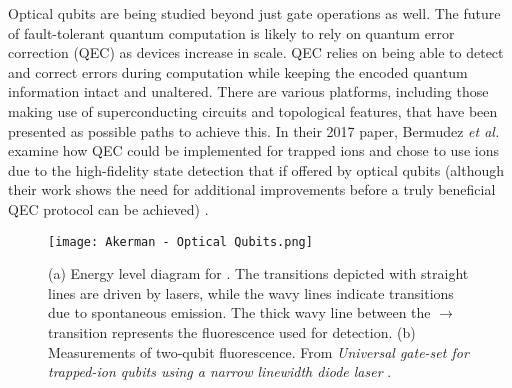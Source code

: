 Optical qubits are being studied beyond just gate operations as well. The future of fault-tolerant quantum computation is likely to rely on quantum error correction (QEC) as devices increase in scale. QEC relies on being able to detect and correct errors during computation while keeping the encoded quantum information intact and unaltered. There are various platforms, including those making use of superconducting circuits and topological features, that have been presented as possible paths to achieve this. In their 2017 paper, Bermudez \textit{et al.} examine how QEC could be implemented for trapped ions and chose to use  ions due to the high-fidelity state detection that if offered by optical qubits (although their work shows the need for additional improvements before a truly beneficial QEC protocol can be achieved) \cite{Bermudez}.

\begin{figure}[h]
    \texttt{[image: Akerman - Optical Qubits.png]}
    \caption{(a) Energy level diagram for . The transitions depicted with straight lines are driven by lasers, while the wavy lines indicate transitions due to spontaneous emission. The thick wavy line between the  $\rightarrow$  transition represents the fluorescence used for detection. (b) Measurements of two-qubit fluorescence. From \textit{Universal gate-set for trapped-ion qubits using a narrow linewidth diode laser} \cite{Akerman}.}
    \label{fig:Optical}
\end{figure}